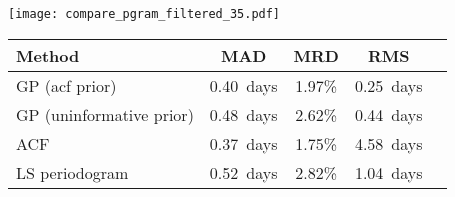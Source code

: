 \documentclass[a4paper,fleqn,usenatbib,useAMS]{mnras}
\newcommand{\naigrain}{333}
\newcommand{\pgramRMS}{1.04}
\newcommand{\pgramMAD}{0.52}
\newcommand{\percentpgramMAD}{2.82}
\newcommand{\gpRMS}{0.25}
\newcommand{\gpMAD}{0.40}
\newcommand{\percentgpMAD}{1.97}
\newcommand{\gpRMSnp}{0.44}
\newcommand{\gpMADnp}{0.48}
\newcommand{\percentgpMADnp}{2.62}
\newcommand{\telavivRMS}{4.58}
\newcommand{\telavivMAD}{0.37}
\newcommand{\percenttelavivMAD}{1.75}
\begin{document}

\begin{figure*}
\begin{center}
\texttt{[image: compare\_pgram\_filtered\_35.pdf]}
\caption[LS periodogram results.]
{The `true' rotation periods used to generate \naigrain\ simulated light
curves vs the rotation periods measured using a LS periodogram technique.
    Points are coloured by the peak-to-peak amplitude of the light curve, as
    defined in \citet{Aigrain2015}.
In many cases a large peak at a long period was present in the periodogram,
    producing a significant over-estimate of the period.
    }
\label{fig:pgram_compare}
\end{center}
\end{figure*}

\begin{table*}
\begin{center}
    \caption{\label{tab:MADs} Median absolute (MAD), median relative (MRD)
    deviations and root-mean-squared (RMS) for the LS periodogram,
    \citet{Mcquillan2013} ACF and GP period recovery methods.}
\begin{tabular}{lcccc}
    Method & MAD & MRD & RMS \\
    \hline
    GP (acf prior) & \gpMAD\ days & \percentgpMAD \% & \gpRMS\ days \\
    GP (uninformative prior) & \gpMADnp\ days & \percentgpMADnp \% &
    \gpRMSnp\ days \\
    ACF & \telavivMAD\ days & \percenttelavivMAD \%
    & \telavivRMS\ days \\
    LS periodogram & \pgramMAD\ days & \percentpgramMAD \% & \pgramRMS\ days\\
\end{tabular}
\end{center}
\end{table*}
\end{document}
